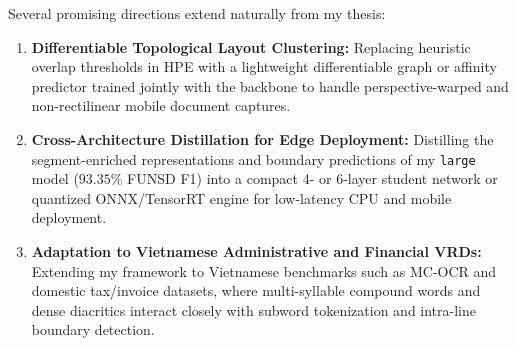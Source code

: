 Several promising directions extend naturally from my thesis:
\begin{enumerate}
    \item \textbf{Differentiable Topological Layout Clustering:} Replacing heuristic overlap thresholds in HPE with a lightweight differentiable graph or affinity predictor trained jointly with the backbone to handle perspective-warped and non-rectilinear mobile document captures.
    \item \textbf{Cross-Architecture Distillation for Edge Deployment:} Distilling the segment-enriched representations and boundary predictions of my \texttt{large} model ($93.35\%$ FUNSD F1) into a compact 4- or 6-layer student network or quantized ONNX/TensorRT engine for low-latency CPU and mobile deployment.
    \item \textbf{Adaptation to Vietnamese Administrative and Financial VRDs:} Extending my framework to Vietnamese benchmarks such as MC-OCR and domestic tax/invoice datasets, where multi-syllable compound words and dense diacritics interact closely with subword tokenization and intra-line boundary detection.
\end{enumerate}
